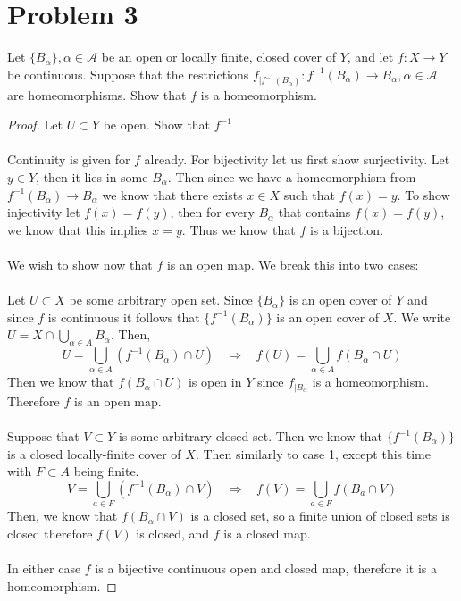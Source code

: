 \documentclass{article}
\theoremstyle{definition}
\begin{document}
\section*{Problem 3}
    \begin{mdframed}
        Let $\{B_\alpha\}, \alpha \in \mathcal{A}$ be an open or locally finite, closed cover of $Y$, and let 
        $f: X \rightarrow Y$ be continuous. Suppose that the restrictions $f_{|f^{-1}(B_\alpha)}:f^{-1}(B_\alpha) \rightarrow B_\alpha, \alpha \in \mathcal{A}$
        are homeomorphisms. Show that $f$ is a homeomorphism.
    \end{mdframed}
    \begin{proof}
         Let $U \subset Y$ be open. Show that $f^{-1}$ \\\\
        Continuity is given for $f$ already. For bijectivity let us first show surjectivity.
        Let $y \in Y$, then it lies in some $B_\alpha$. Then since we have a homeomorphism from $f^{-1}(B_\alpha) \rightarrow B_\alpha$
        we know that there exists $x \in X$ such that $f(x) = y$. To show injectivity let $f(x) = f(y)$, then for every $B_\alpha$ that contains $f(x) = f(y)$,
        we know that this implies $x = y$. Thus we know that $f$ is a bijection.
        \\\\
        We wish to show now that $f$ is an open map. We break this into two cases:\\\\
         Let $U \subset X$ be some arbitrary open set.
        Since $\{B_\alpha\}$ is an open cover of $Y$ and since $f$ is continuous it follows that $\{f^{-1}(B_\alpha)\}$ is an open 
        cover of $X$. We write $U = X \cap \bigcup_{\alpha \in A}B_\alpha$.
        Then,\[
            U = \bigcup_{\alpha \in A}(f^{-1}(B_\alpha) \cap U) \ \ \ \ \Longrightarrow \ \ \ \ f(U) = \bigcup_{\alpha \in A}f(B_\alpha \cap U)
        \]
        Then we know that $f(B_\alpha \cap U)$ is open in $Y$ since $f_{|B_\alpha}$ is a homeomorphism. Therefore $f$ is an open map.\\\\
         Suppose that $V \subset Y$ is some arbitrary closed set.
        Then we know that $\{f^{-1}(B_\alpha)\}$ is a closed locally-finite cover of $X$. Then similarly to case 1, except this time with $F \subset A$ being finite.
        \[
            V = \bigcup_{a \in F}(f^{-1}(B_\alpha) \cap V) \ \ \ \ \Longrightarrow \ \ \ \ f(V) = \bigcup_{a \in F}f(B_a \cap V)
        \]
        Then, we know that $f(B_\alpha \cap V)$ is a closed set, so a finite union of closed sets is closed therefore $f(V)$ is closed, and $f$ is a closed map.\\\\
        In either case $f$ is a bijective continuous open and closed map, therefore it is a homeomorphism.
    \end{proof}
\end{document}
